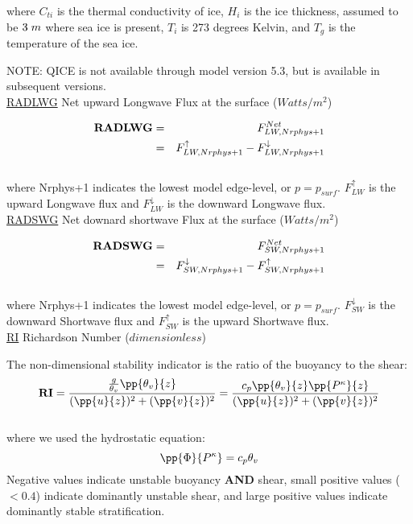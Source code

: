where $C_{ti}$ is the thermal conductivity of ice, $H_i$ is the ice thickness, assumed to
be $3 \hspace{.1cm} m$ where sea ice is present, $T_i$ is 273 degrees Kelvin, and
$T_g$ is the temperature of the sea ice.

NOTE: QICE is not available through model version 5.3, but is available in subsequent versions.
\\
 

{ \underline {RADLWG} Net upward Longwave Flux at the surface ($Watts/m^2$)}

\begin{eqnarray*}
{\bf RADLWG} & =  & F_{LW,Nrphys+1}^{Net} \\
             & =  & F_{LW,Nrphys+1}^\uparrow - F_{LW,Nrphys+1}^\downarrow
\end{eqnarray*}
\\
where Nrphys+1 indicates the lowest model edge-level, or $p = p_{surf}$.
$F_{LW}^\uparrow$ is
the upward Longwave flux and $F_{LW}^\downarrow$ is the downward Longwave flux.
\\

{ \underline {RADSWG} Net downard shortwave Flux at the surface ($Watts/m^2$)}

\begin{eqnarray*}
{\bf RADSWG} & =  & F_{SW,Nrphys+1}^{Net} \\
             & =  & F_{SW,Nrphys+1}^\downarrow - F_{SW,Nrphys+1}^\uparrow
\end{eqnarray*}
\\
where Nrphys+1 indicates the lowest model edge-level, or $p = p_{surf}$.
$F_{SW}^\downarrow$ is
the downward Shortwave flux and $F_{SW}^\uparrow$ is the upward Shortwave flux.
\\


\noindent
{ \underline {RI} Richardson Number} ($dimensionless$)

\noindent
The non-dimensional stability indicator is the ratio of the buoyancy to the shear:
\[
{\bf RI} = { { {g \over \theta_v} \pp {\theta_v}{z} } \over { (\pp{u}{z})^2 + (\pp{v}{z})^2 } }
 =  {  {c_p \pp{\theta_v}{z} \pp{P^ \kappa}{z} } \over { (\pp{u}{z})^2 + (\pp{v}{z})^2 } }
\]
\\
where we used the hydrostatic equation: 
\[
{\pp{\Phi}{P^ \kappa}} = c_p \theta_v
\]
Negative values indicate unstable buoyancy {\bf{AND}} shear, small positive values ($<0.4$)
indicate dominantly unstable shear, and large positive values indicate dominantly stable
stratification.
\\

